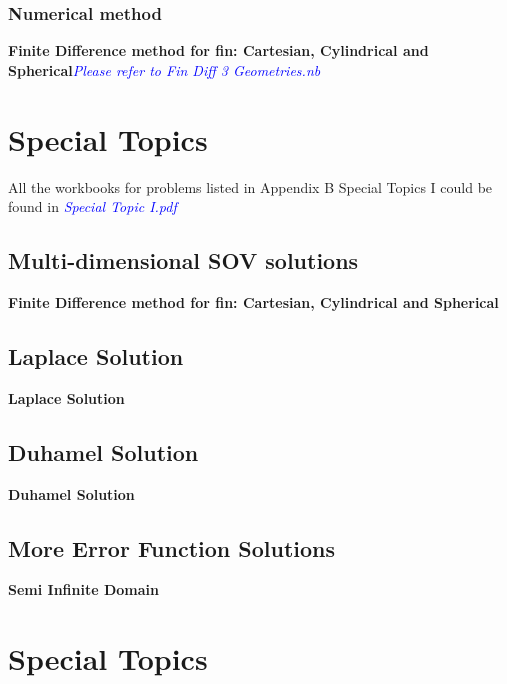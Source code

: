 \begin{appendices}
\subsection{Numerical method}
\begin{example}
\textbf{Finite Difference method for fin: Cartesian, Cylindrical and Spherical}\textcolor{blue} {\emph{Please refer to Fin Diff 3 Geometries.nb}}
\end{example}

\chapter{Special Topics \uppercase\expandafter{}}
All the workbooks for problems listed in Appendix B Special Topics I could be found in \textcolor{blue} {\emph{Special Topic I.pdf}}
\section{Multi-dimensional SOV solutions}

\begin{example}
\textbf{Finite Difference method for fin: Cartesian, Cylindrical and Spherical}
\end{example}

\section{Laplace Solution}
\begin{example}
\textbf{Laplace Solution}
\end{example}

\section{Duhamel Solution}
\begin{example}
\textbf{Duhamel Solution}
\end{example}

\section{More Error Function Solutions}
\begin{example}
\textbf{Semi Infinite Domain}
\end{example}

\chapter{Special Topics \uppercase\expandafter{}}


\end{appendices}
